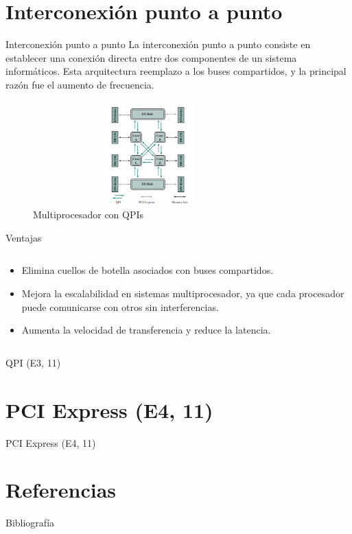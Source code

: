 \documentclass[presentation]{beamer}
\begin{document}
\section{Interconexión punto a punto}
\label{sec:org34b8cbe}
\begin{frame}[label={sec:org83f7b79}]{Interconexión punto a punto}
La interconexión punto a punto consiste en establecer una conexión directa entre dos componentes de un sistema informáticos.
Esta arquitectura reemplazo a los buses compartidos, y la principal razón fue el aumento de frecuencia.

\begin{figure}[!h]
   \vspace{-0.1cm}
   \centering
   \includegraphics[height=4cm, width=0.8\textwidth]{./Images/image1.png}
   \vspace{-0.5cm} %
   \caption{Multiprocesador con QPIs}
   \label{fig:Representacion}
\end{figure}
\end{frame}

\begin{frame}[label={sec:orged4ec31}]{Ventajas}
\begin{columns}
\begin{column}{0.8\columnwidth}
\begin{itemize}
\item Elimina cuellos de botella asociados con buses compartidos.
\item Mejora la escalabilidad en sistemas multiprocesador, ya que cada procesador puede comunicarse con otros sin interferencias.
\item Aumenta la velocidad de transferencia y reduce la latencia.
\end{itemize}
\end{column}
\end{columns}
\end{frame}
\begin{frame}[label={sec:orgb74d3db}]{QPI (E3, 11)}
\end{frame}
\section{PCI Express (E4, 11)}
\label{sec:orgbf211cc}
\begin{frame}[label={sec:orgb9a1c11}]{PCI Express (E4, 11)}
\end{frame}
\section{Referencias}
\label{sec:org173474d}
\begin{frame}[allowframebreaks]{Bibliografía}
\printbibliography
\end{frame}
\end{document}
